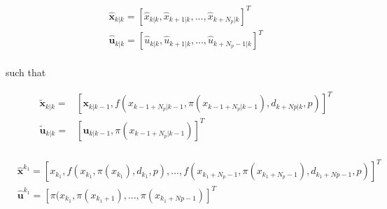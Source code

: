 \begin{equation}\label{eq:initial-guess-2}
	\begin{aligned}
		&\hat{\mathbf{x}}_{k|k} = [\hat{x}_{k|k},\hat{x}_{k+1|k},...,\hat{x}_{k + N_p|k}]^T \\ 
		&\hat{\mathbf{u}}_{k|k} = [\hat{u}_{k|k},\hat{u}_{k + 1|k},...,\hat{u}_{k + N_p - 1|k}]^T\\ 
	\end{aligned}
\end{equation}

such that

 \begin{equation}\label{eq:horizon_extension}
 	\begin{aligned}
 		&\tilde{\mathbf{x}}_{k|k} = &[\mathbf{x}_{k|k-1},f(x_{k-1 + N_p|k-1}, \pi(x_{k-1 + N_p|k-1}), d_{k+Np|k},p)]^T\\ 
 		&\tilde{\mathbf{u}}_{k|k} = &[\mathbf{u}_{k|k-1},\pi(x_{k-1 + N_p|k-1})]^T\\
 	\end{aligned}
 \end{equation}

\begin{equation}\label{eq:actor_roll_out}
	\begin{aligned}
		&\hat{\mathbf{x}}^{k_1} = [x_{k_1},f(x_{k_1},\pi(x_{k_1}),d_{k_1},p),..., f(x_{k_1 + N_p-1}, \pi(x_{k_1 + N_p-1}), d_{k_1 + Np-1},p)]^T \\ 
		&\hat{\mathbf{u}}^{k_1} = [\pi(x_{k_1},\pi(x_{k_1+1}),...,\pi(x_{k_1+Np-1})]^T \\ 
	\end{aligned}
	\end{equation}


%

